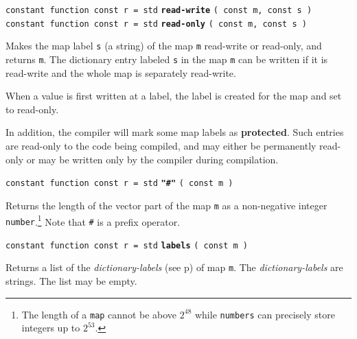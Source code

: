 \documentclass[12pt]{article}
\newcommand{\key}[1]{{\rm \bfseries #1}}
\newcommand{\ttkey}[1]{{\tt \bfseries #1}}
\newcommand{\pagref}[1]{p\pageref{#1}}
\newenvironment{indpar}[1][0.3in]%
	{\begin{list}{}%
		     {\setlength{\itemsep}{0in}%
		      \setlength{\topsep}{0in}%
		      \setlength{\parsep}{1ex}%
		      \setlength{\labelwidth}{#1}%
		      \setlength{\leftmargin}{#1}%
		      \addtolength{\leftmargin}{\labelsep}}%
	 \item}%
	{\end{list}}
\begin{document}
{\tt constant function const r = std} \ttkey{read-write}
                                      {\tt ( const m, const s )} \\
{\tt constant function const r = std} \ttkey{read-only}
                                      {\tt ( const m, const s )} %
\label{READ-ONLY-DICTIONARY-FUNCTION}
\begin{indpar}
Makes the map label {\tt s} (a string) of the map {\tt m}
read-write or read-only, and returns {\tt m}.  The dictionary entry
labeled {\tt s} in the map {\tt m} can be written if it is
read-write and the whole map is separately read-write.

When a value is first written at a label, the label is created
for the map and set to read-only.

In addition, the compiler will mark some map labels as \key{protected}.
Such entries are read-only to the code being compiled, and may either be
permanently read-only or may be written only by the compiler
during compilation.
\end{indpar}

{\tt constant function const r = std} \ttkey{"\#"} {\tt ( const m )}
\begin{indpar}
Returns the length of the vector part of the map {\tt m}
as a non-negative integer
{\tt number}.\footnote{The length of a {\tt map} cannot
be above $2^{48}$ while
{\tt numbers} can precisely store integers up to $2^{53}$.}
Note that {\tt \#} is a prefix operator.
\end{indpar}

{\tt constant function const r = std} \ttkey{labels} {\tt ( const m )}
\begin{indpar}
Returns a list of the {\em dictionary-labels}
(see \pagref{DICTIONARY-LABEL}) of map {\tt m}.
The {\em dictionary-labels} are strings.  The list may be empty.
\end{indpar}
\end{document}
